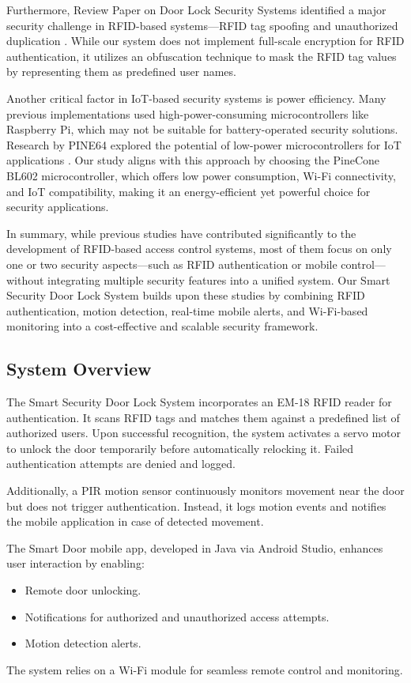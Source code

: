 \documentclass[a4paper]{scrartcl}
\begin{document}
Furthermore, Review Paper on Door Lock Security Systems identified a major security
challenge in RFID-based systems—RFID tag spoofing and unauthorized duplication \cite{RFIDInc2025}. 
While our system does not implement full-scale encryption for RFID authentication, it 
utilizes an obfuscation technique to mask the RFID tag values by representing them as 
predefined user names.


Another critical factor in IoT-based security systems is power efficiency. Many previous implementations used high-power-consuming microcontrollers like Raspberry Pi\cite{RaspberryPiWiki}, which may not be suitable for battery-operated security solutions. Research by PINE64 explored the potential of low-power microcontrollers for IoT applications \cite{PINE64}. Our study aligns with this approach by choosing the PineCone BL602 microcontroller, which offers low power consumption, Wi-Fi connectivity, and IoT compatibility, making it an energy-efficient yet powerful choice for security applications.

In summary, while previous studies have contributed significantly to the development of RFID-based access control systems, most of them focus on only one or two security aspects—such as RFID authentication or mobile control—without integrating multiple security features into a unified system. Our Smart Security Door Lock System builds upon these studies by combining RFID authentication, motion detection, real-time mobile alerts, and Wi-Fi-based monitoring into a cost-effective and scalable security framework.

\subsection{System Overview}
The Smart Security Door Lock System incorporates an EM-18 RFID reader for authentication. It scans RFID tags and matches them against a predefined list of authorized users. Upon successful recognition, the system activates a servo motor to unlock the door temporarily before automatically relocking it. Failed authentication attempts are denied and logged.

Additionally, a PIR motion sensor continuously monitors movement near the door but does not trigger authentication. Instead, it logs motion events and notifies the mobile application in case of detected movement.

The {Smart Door mobile app}, developed in {Java via Android Studio}, enhances user interaction by enabling:
\begin{itemize}
    \item Remote door unlocking.
    \item Notifications for authorized and unauthorized access attempts.
    \item Motion detection alerts.
\end{itemize}
The system relies on a Wi-Fi module for seamless remote control and monitoring.
\end{document}
